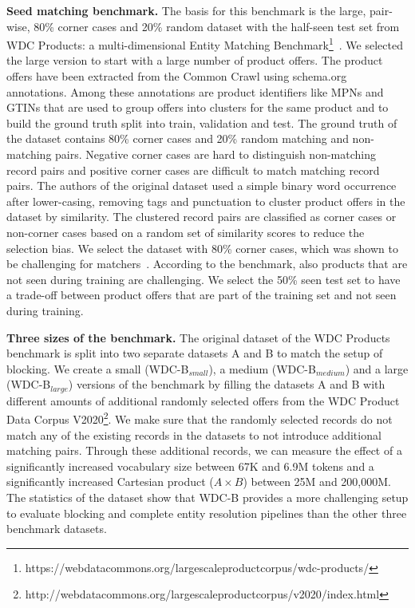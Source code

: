 \documentclass[sigconf,nonacm]{acmart}
\begin{document}
\vspace{.1cm}\noindent\textbf{Seed matching benchmark.}
The basis for this benchmark is the large, pair-wise, 80\% corner cases and 20\% random dataset with the half-seen test set from WDC Products: a multi-dimensional Entity Matching Benchmark\footnote{https://webdatacommons.org/largescaleproductcorpus/wdc-products/}~\cite{peeters_wdc_2023}.
We selected the large version to start with a large number of product offers.
The product offers have been extracted from the Common Crawl using schema.org annotations. Among these annotations are product identifiers like MPNs and GTINs that are used to group offers into clusters for the same product and to build the ground truth split into train, validation and test.
The ground truth of the dataset contains 80\% corner cases and 20\% random matching and non-matching pairs.
Negative corner cases are hard to distinguish non-matching record pairs and positive corner cases are difficult to match matching record pairs.
The authors of the original dataset used a simple binary word occurrence after lower-casing, removing tags and punctuation to cluster product offers in the dataset by similarity.
The clustered record pairs are classified as corner cases or non-corner cases based on a random set of similarity scores to reduce the selection bias.
We select the dataset with 80\% corner cases, which was shown to be challenging for matchers~\cite{peeters_wdc_2023}.
According to the benchmark, also products that are not seen during training are challenging.
We select the 50\% seen test set to have a trade-off between product offers that are part of the training set and not seen during training.

\vspace{.1cm}\noindent\textbf{Three sizes of the benchmark.}
The original dataset of the WDC Products benchmark is split into two separate datasets A and B to match the setup of blocking.
We create a small (WDC-B$_{small}$), a medium (WDC-B$_{medium}$) and a large (WDC-B$_{large}$) versions of the benchmark by filling the datasets A and B with different amounts of additional randomly selected offers from the WDC Product Data Corpus V2020\footnote{http://webdatacommons.org/largescaleproductcorpus/v2020/index.html}.
We make sure that the randomly selected records do not match any of the existing records in the datasets to not introduce additional matching pairs.
Through these additional records, we can measure the effect of a significantly increased vocabulary size between 67K and 6.9M tokens and a significantly increased Cartesian product ($A \times B$) between 25M and 200,000M.
The statistics of the dataset show that WDC-B provides a more challenging setup to evaluate blocking and complete entity resolution pipelines than the other three benchmark datasets.
\end{document}
